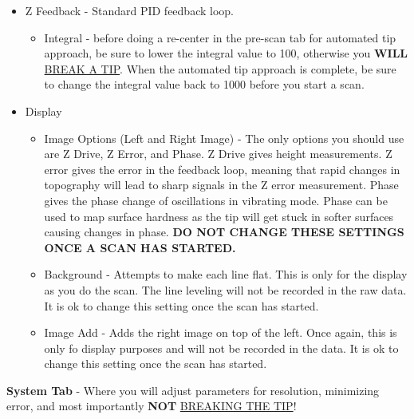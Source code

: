 \documentclass{../lab}
\begin{document}
\begin{itemize}
\pagebreak

    \item Z Feedback - Standard PID feedback loop.

    \begin{itemize}
        \item Integral - before doing a re-center in the pre-scan tab for automated tip approach, be sure to lower the integral value to 100, otherwise you \textbf{WILL} \hyperref[subsec:BrokenTip]{BREAK A TIP}. When the automated tip approach is complete, be sure to change the integral value back to 1000 before you start a scan.
    \end{itemize}

    \item Display

    \begin{itemize}
        \item Image Options (Left and Right Image) - The only options you should use are Z Drive, Z Error, and Phase. Z Drive gives height measurements. Z error gives the error in the feedback loop, meaning that rapid changes in topography will lead to sharp signals in the Z error measurement. Phase gives the phase change of oscillations in vibrating mode. Phase can be used to map surface hardness as the tip will get stuck in softer surfaces causing changes in phase. \textbf{DO NOT CHANGE THESE SETTINGS ONCE A SCAN HAS STARTED.}

        \item Background - Attempts to make each line flat. This is only for the display as you do the scan. The line leveling will not be recorded in the raw data. It is ok to change this setting once the scan has started.

        \item Image Add - Adds the right image on top of the left. Once again, this is only fo display purposes and will not be recorded in the data. It is ok to change this setting once the scan has started.

    \end{itemize}

\end{itemize}

\textbf{System Tab} - Where you will adjust parameters for resolution, minimizing error, and most importantly \textbf{NOT} \hyperref[subsec:BrokenTip]{BREAKING THE TIP}!
\end{document}
